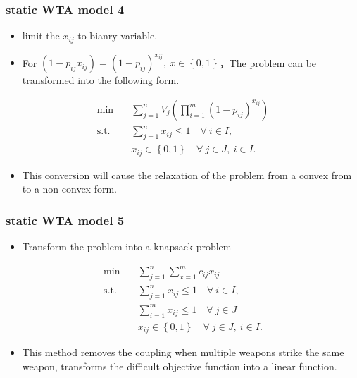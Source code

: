 \documentclass[CJK,10pt]{beamer}
\begin{document}
\begin{frame}
    \frametitle{static WTA model 4}
    \begin{itemize}
        \item limit the $x_{ij}$ to bianry variable.
        \item For $(1-p_{ij}x_{ij}) = (1-p_{ij})^{x_{ij}},~ x \in \left\{ 0,1\right\}$，The problem can be transformed into the following form.
    \end{itemize}
    \begin{align*} \tag{S4}
        \min\quad & \sum_{j=1}^n V_j \left( \prod_{i=1}^m (1 -  p_{ij})^{x_{ij}} \right) \\ 
        \mathrm{s. t.}\quad &\sum_{j=1}^n x_{ij} \leq 1\quad \forall ~i \in I,\\
        & x_{ij} \in \left\{ 0,1 \right\} \quad \forall~ j\in J , ~ i \in I.
    \end{align*}
    \begin{itemize}
        \item This conversion will cause the relaxation of the problem from a convex from to a non-convex form.
    \end{itemize}
\end{frame}

\begin{frame}
    \frametitle{static WTA model 5}
    \begin{itemize}
        \item Transform the problem into a knapsack problem
    \end{itemize}
    \begin{align*} \tag{S5}
        \min\quad & \sum_{j=1}^n{\sum_{x=1}^m{c_{ij}x_{ij}}} \\ 
        \mathrm{s. t.}\quad &\sum_{j=1}^n x_{ij} \leq 1\quad \forall ~i \in I,\\
        & \sum_{i=1}^m x_{ij} \leq 1\quad \forall ~j \in J \\
        & x_{ij} \in \left\{ 0,1 \right\} \quad \forall~ j\in J , ~ i \in I.
    \end{align*}
    \begin{itemize}
        \item This method removes the coupling when multiple weapons strike the same weapon, transforms the difficult objective function into a linear function.
    \end{itemize}
\end{frame}
\end{document}
